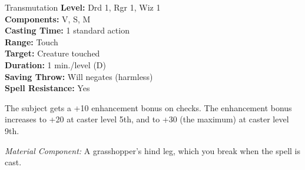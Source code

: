 {Transmutation}
{
	\textbf{Level:}
	Drd 1, Rgr 1, Wiz 1\\
	\textbf{Components:}
	V, S, M\\
	\textbf{Casting Time:}
	1 standard action\\
	\textbf{Range:}
	Touch\\
	\textbf{Target:}
	Creature touched\\
	\textbf{Duration:}
	1 min./level (D)\\
	\textbf{Saving Throw:}
	Will negates (harmless)\\
	\textbf{Spell Resistance:}
	Yes\\
}
{
	The subject gets a +10 enhancement bonus on  checks. The enhancement bonus increases to +20 at caster level 5th, and to +30 (the maximum) at caster level 9th.

	\textit{Material Component:}
	A grasshopper's hind leg, which you break when the spell is cast.

}
